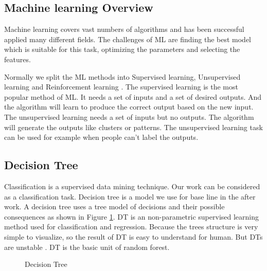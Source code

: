 \subsection{Machine learning Overview} %

 Machine learning covers vast numbers of algorithms and has been successful applied many different fields. The challenges of ML are finding the best model which is suitable for this task, optimizing the parameters and selecting the features. 
 
Normally we split the ML methods into Supervised learning, Unsupervised learning and Reinforcement learning \cite{russell2003artificial}. The supervised learning is the most popular method of ML. It needs a set of inputs and a set of desired outputs. And the algorithm will learn to produce the correct output based on the new input. The unsupervised learning needs a set of inputs but no outputs. The algorithm will generate the outputs like clusters or patterns. The unsupervised learning task can be used for example when people can't label the outputs. 
\subsection{Decision Tree} %
Classification is a supervised data mining technique. Our work can be considered as a classification task. Decision tree is a model we use for base line in the after work. A decision tree uses a tree model of decisions and their possible consequences as shown in Figure \ref{fig:detrees}.  DT is an non-parametric supervised learning method used for classification and regression. Because the trees structure is very simple to visualize, so the result of DT is easy to understand for human. But DTs are unstable \cite{breiman1996bagging}. DT is the basic unit of random forest.
\begin{figure}[!h]
\center
{}

\caption{Decision Tree}
\label{fig:detrees}

\end{figure}

